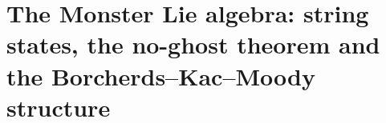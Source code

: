 \chapter{The Monster Lie algebra: string states, the no-ghost theorem and the Borcherds--Kac--Moody structure}\label{ch:18}

\providecommand{\chXVIIIm}{\mathfrak{m}}
\providecommand{\chXVIIIg}{\mathfrak{g}}
\providecommand{\chXVIIIu}{\mathfrak{u}}
\providecommand{\chXVIIIp}{\mathfrak{p}}
\providecommand{\chXVIIIl}{\mathfrak{l}}
\providecommand{\chXVIIIh}{\mathfrak{h}}
\providecommand{\chXVIIIII}{\mathrm{II}_{1,1}}
\providecommand{\chXVIIIS}{\mathcal{S}}
\providecommand{\chXVIIIP}{\mathcal{P}}
\providecommand{\chXVIIIK}{\mathcal{K}}
\providecommand{\chXVIIIT}{\mathcal{T}}
\providecommand{\chXVIIIU}{\mathcal{U}}
\providecommand{\chXVIIIN}{\mathcal{N}}

